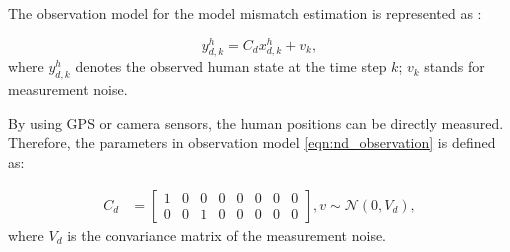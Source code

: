 \documentclass[journal]{IEEEtran}
\begin{document}
	The observation model for the model mismatch estimation is represented as : 
\addtocounter{equation}{-3}
\begin{equation}
		y_{d,k}^h=C_dx_{d,k}^h+v_k,\label{eqn:nd_observation}
	\end{equation}
	where $y_{d,k}^h$ denotes the observed human state at the time step $k$; $v_k$ stands for measurement noise. 
	
	By using GPS or camera sensors, the human positions can be directly measured.
	Therefore, the parameters in observation model \cref{eqn:nd_observation} is defined as:

   \begin{subequations}
		\begin{align*}
			C_d&=\left[
			\begin{array}{cccccccc}
				1& 0& 0& 0& 0& 0& 0& 0\\
				0& 0& 1& 0& 0& 0& 0& 0
			\end{array}\right],
			v\sim\mathcal{N}(0,V_d),
		\end{align*}
	\end{subequations}\normalsize
	where $V_d$ is the convariance matrix of the measurement noise.	
\end{document}
